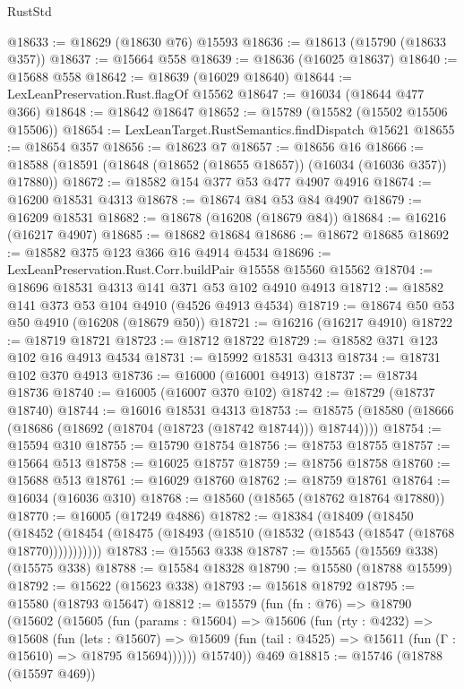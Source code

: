 \begin{lexlean}{RustStd}
\begin{coremodule}
@18633 := @18629 (@18630 @76) @15593
@18636 := @18613 (@15790 (@18633 @357))
@18637 := @15664 @558
@18639 := @18636 (@16025 @18637)
@18640 := @15688 @558
@18642 := @18639 (@16029 @18640)
@18644 := LexLeanPreservation.Rust.flagOf @15562
@18647 := @16034 (@18644 @477 @366)
@18648 := @18642 @18647
@18652 := @15789 (@15582 (@15502 @15506 @15506))
@18654 := LexLeanTarget.RustSemantics.findDispatch @15621
@18655 := @18654 @357
@18656 := @18623 @7
@18657 := @18656 @16
@18666 := @18588 (@18591 (@18648 (@18652 (@18655 @18657)) (@16034 (@16036 @357)) @17880))
@18672 := @18582 @154 @377 @53 @477 @4907 @4916
@18674 := @16200 @18531 @4313
@18678 := @18674 @84 @53 @84 @4907
@18679 := @16209 @18531
@18682 := @18678 (@16208 (@18679 @84))
@18684 := @16216 (@16217 @4907)
@18685 := @18682 @18684
@18686 := @18672 @18685
@18692 := @18582 @375 @123 @366 @16 @4914 @4534
@18696 := LexLeanPreservation.Rust.Corr.buildPair @15558 @15560 @15562
@18704 := @18696 @18531 @4313 @141 @371 @53 @102 @4910 @4913
@18712 := @18582 @141 @373 @53 @104 @4910 (@4526 @4913 @4534)
@18719 := @18674 @50 @53 @50 @4910 (@16208 (@18679 @50))
@18721 := @16216 (@16217 @4910)
@18722 := @18719 @18721
@18723 := @18712 @18722
@18729 := @18582 @371 @123 @102 @16 @4913 @4534
@18731 := @15992 @18531 @4313
@18734 := @18731 @102 @370 @4913
@18736 := @16000 (@16001 @4913)
@18737 := @18734 @18736
@18740 := @16005 (@16007 @370 @102)
@18742 := @18729 (@18737 @18740)
@18744 := @16016 @18531 @4313
@18753 := @18575 (@18580 (@18666 (@18686 (@18692 (@18704 (@18723 (@18742 @18744))) @18744))))
@18754 := @15594 @310
@18755 := @15790 @18754
@18756 := @18753 @18755
@18757 := @15664 @513
@18758 := @16025 @18757
@18759 := @18756 @18758
@18760 := @15688 @513
@18761 := @16029 @18760
@18762 := @18759 @18761
@18764 := @16034 (@16036 @310)
@18768 := @18560 (@18565 (@18762 @18764 @17880))
@18770 := @16005 (@17249 @4886)
@18782 := @18384
    (@18409
      (@18450
        (@18452 (@18454 (@18475 (@18493 (@18510 (@18532 (@18543 (@18547 (@18768 @18770)))))))))))
@18783 := @15563 @338
@18787 := @15565 (@15569 @338) (@15575 @338)
@18788 := @15584 @18328
@18790 := @15580 (@18788 @15599)
@18792 := @15622 (@15623 @338)
@18793 := @15618 @18792
@18795 := @15580 (@18793 @15647)
@18812 := @15579
    (fun (fn : @76) =>
    @18790
      (@15602
        (@15605
          (fun (params : @15604) =>
          @15606
            (fun (rty : @4232) =>
            @15608
              (fun (lets : @15607) =>
              @15609 (fun (tail : @4525) => @15611 (fun (Γ : @15610) => @18795 @15694))))))
        @15740))
    @469
@18815 := @15746 (@18788 (@15597 @469))

\end{coremodule}
\end{lexlean}
